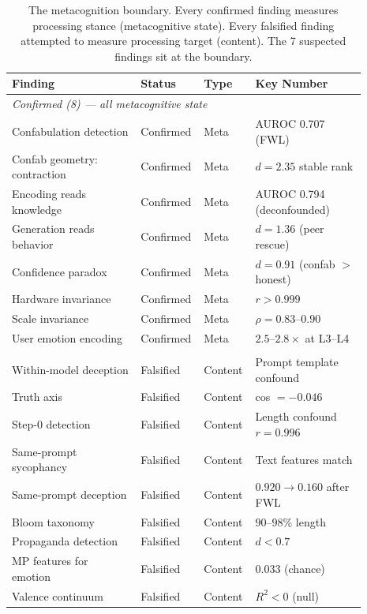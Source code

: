 \documentclass[11pt,a4paper]{article}
\begin{document}
\begin{table}[ht]
\centering
\small
\caption{The metacognition boundary. Every confirmed finding measures
processing stance (metacognitive state). Every falsified finding
attempted to measure processing target (content). The 7 suspected
findings sit at the boundary.}
\label{tab:bodycount}
\begin{tabular}{p{0.35\linewidth}p{0.12\linewidth}p{0.12\linewidth}p{0.30\linewidth}}
\toprule
\textbf{Finding} & \textbf{Status} & \textbf{Type} & \textbf{Key Number} \\
\midrule
\multicolumn{4}{l}{\textit{Confirmed (8) --- all metacognitive state}} \\
\addlinespace
Confabulation detection & Confirmed & Meta & AUROC 0.707 (FWL) \\
Confab geometry: contraction & Confirmed & Meta & $d{=}2.35$ stable rank \\
Encoding reads knowledge & Confirmed & Meta & AUROC 0.794 (deconfounded) \\
Generation reads behavior & Confirmed & Meta & $d{=}1.36$ (peer rescue) \\
Confidence paradox & Confirmed & Meta & $d{=}0.91$ (confab $>$ honest) \\
Hardware invariance & Confirmed & Meta & $r{>}0.999$ \\
Scale invariance & Confirmed & Meta & $\rho{=}0.83$--$0.90$ \\
User emotion encoding & Confirmed & Meta & $2.5$--$2.8\times$ at L3--L4 \\
\addlinespace
\midrule
\multicolumn{4}{l}{\textit{Falsified (10) --- all content}} \\
\addlinespace
Within-model deception & Falsified & Content & Prompt template confound \\
Truth axis & Falsified & Content & cos $= -0.046$ \\
Step-0 detection & Falsified & Content & Length confound $r{=}0.996$ \\
Same-prompt sycophancy & Falsified & Content & Text features match \\
Same-prompt deception & Falsified & Content & $0.920 \to 0.160$ after FWL \\
Bloom taxonomy & Falsified & Content & $90$--$98\%$ length \\
Propaganda detection & Falsified & Content & $d{<}0.7$ \\
MP features for emotion & Falsified & Content & $0.033$ (chance) \\
Valence continuum & Falsified & Content & $R^2 < 0$ (null) \\

\end{tabular}
\end{table}
\end{document}
